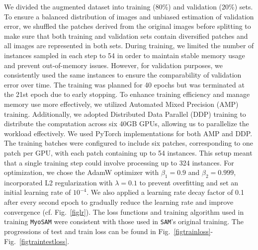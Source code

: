 We divided the augmented dataset into training (80\%) and validation (20\%) sets. To ensure a balanced distribution of images and unbiased estimation of validation error, we shuffled the patches derived from the original images before splitting to make sure that both training and validation sets contain diversified patches and all images are represented in both sets.
During training, we limited the number of instances sampled in each step to 54 in order to maintain stable memory usage and prevent out-of-memory issues. However, for validation purposes, we consistently used the same instances to ensure the comparability of validation error over time. The training was planned for 40 epochs but was terminated at the 21st epoch due to early stopping.
To enhance training efficiency and manage memory use more effectively, we utilized Automated Mixed Precision (AMP) training. Additionally, we adopted Distributed Data Parallel (DDP) training to distribute the computation across six 40GB GPUs, allowing us to parallelize the workload effectively. We used PyTorch \cite{paszke2019pytorch} implementations for both AMP and DDP. The training batches were configured to include six patches, corresponding to one patch per GPU, with each patch containing up to 54 instances. This setup meant that a single training step could involve processing up to 324 instances.
For optimization, we chose the AdamW optimizer with $\beta_1 = 0.9$ and $\beta_2 = 0.999$, incorporated L2 regularization with $\lambda = 0.1$ to prevent overfitting and set an initial learning rate of $10^{-4}$. We also applied a learning rate decay factor of 0.1 after every second epoch to gradually reduce the learning rate and improve convergence (cf. Fig.~\ref{figlr}). The loss functions and training algorithm used in training \texttt{MyoSAM} were consistent with those used in \texttt{SAM}'s original training. The progressions of test and train loss can be found in Fig.~\ref{figtrainloss}-Fig.~\ref{figtraintestloss}.

